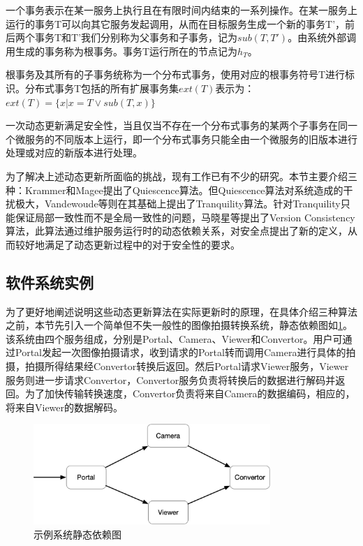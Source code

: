 \documentclass[macfonts,master]{njuthesis}
\begin{document}
\begin{definition}[事务]\label{def:transaction}
一个事务表示在某一服务上执行且在有限时间内结束的一系列操作。在某一服务上运行的事务T可以向其它服务发起调用，从而在目标服务生成一个新的事务T'，前后两个事务T和T'我们分别称为父事务和子事务，记为$sub (T, T') $。由系统外部调用生成的事务称为根事务。事务T运行所在的节点记为$h_T$。
\end{definition}

\begin{definition}[分布式事务]\label{def:dis_transaction}
根事务及其所有的子事务统称为一个分布式事务，使用对应的根事务符号T进行标识。分布式事务T包括的所有扩展事务集$ext (T) $表示为：$ext (T)  = \{x|x=T \vee sub (T,x) \}$
\end{definition}

\begin{definition}[动态更新的安全性]\label{def:safety}
一次动态更新满足安全性，当且仅当不存在一个分布式事务的某两个子事务在同一个微服务的不同版本上运行，即一个分布式事务只能全由一个微服务的旧版本进行处理或对应的新版本进行处理。
\end{definition}

为了解决上述动态更新所面临的挑战，现有工作已有不少的研究。本节主要介绍三种：Krammer和Magee提出了Quiescence\cite{kramer1990evolving}算法。但Quiescence算法对系统造成的干扰极大，Vandewoude等则在其基础上提出了Tranquility\cite{vandewoude2007tranquility}算法。针对Tranquility只能保证局部一致性而不是全局一致性的问题，马晓星等提出了Version Consistency\cite{ma2011version}算法，此算法通过维护服务运行时的动态依赖关系，对安全点提出了新的定义，从而较好地满足了动态更新过程中的对于安全性的要求。

\subsection{软件系统实例}\label{sec:example}
为了更好地阐述说明这些动态更新算法在实际更新时的原理，在具体介绍三种算法之前，本节先引入一个简单但不失一般性的图像拍摄转换系统，静态依赖图如\ref{fig:example}。该系统由四个服务组成，分别是Portal、Camera、Viewer和Convertor。用户可通过Portal发起一次图像拍摄请求，收到请求的Portal转而调用Camera进行具体的拍摄，拍摄所得结果经Convertor转换后返回。然后Portal请求Viewer服务，Viewer服务则进一步请求Convertor，Convertor服务负责将转换后的数据进行解码并返回。为了加快传输转换速度，Convertor负责将来自Camera的数据编码，相应的，将来自Viewer的数据解码。

\begin{figure}[!htbp]
  \centering
  \includegraphics[width= 0.8\textwidth]{image/example.png}
  \caption{示例系统静态依赖图}
  \label{fig:example}
\end{figure}
\end{document}
